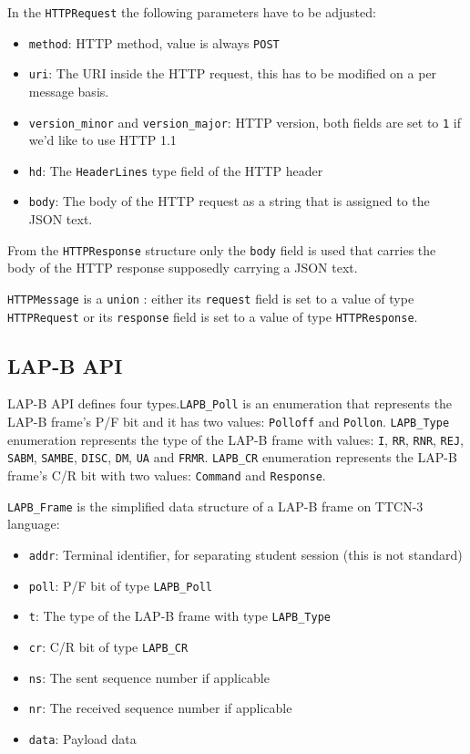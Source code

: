 \documentclass[a4paper]{article}
\begin{document}
In the \verb/HTTPRequest/ the following parameters have to be adjusted:
\begin{itemize}
\item \verb!method!: HTTP method, value is always \verb'POST'
\item \verb'uri': The URI inside the HTTP request, this has to be modified on a per message basis.
\item \verb!version_minor! and \verb!version_major!: HTTP version, both fields are set to \verb!1! if we'd like to use HTTP 1.1
\item \verb!hd!: The \verb/HeaderLines/ type field of the HTTP header
\item \verb!body!: The body of the HTTP request as a string that is assigned to the JSON text.
\end{itemize}

From the \verb!HTTPResponse! structure only the  \verb!body! field is used that carries the body of the HTTP response supposedly carrying a JSON text.

\verb!HTTPMessage! is a \verb!union! : either its \verb!request! field is set to a value of type \verb/HTTPRequest/ or its \verb!response! field is set to a value of type \verb!HTTPResponse!.

\subsection{LAP-B API}

LAP-B API defines four types.\verb/LAPB_Poll/ is an enumeration that represents the LAP-B frame's P/F bit and it has two values: \verb/Polloff/ and \verb/Pollon/. 
\verb/LAPB_Type/ enumeration represents the type of the LAP-B frame with values: \verb/I/, \verb/RR/, \verb/RNR/, \verb/REJ/,
\verb/SABM/, \verb/SAMBE/, \verb/DISC/, \verb/DM/, \verb/UA/ and
\verb/FRMR/. 
\verb/LAPB_CR/ enumeration represents the LAP-B frame's C/R bit with two values: \verb/Command/ and \verb/Response/.

\verb!LAPB_Frame! is the simplified data structure of a LAP-B frame on TTCN-3 language:
\begin{itemize}
\item \verb/addr/: Terminal identifier, for separating student session (this is not standard)
\item \verb!poll!:  P/F bit of type \verb/LAPB_Poll/ 
\item  \verb!t!: The type of the LAP-B frame with type \verb/LAPB_Type/
\item \verb!cr!: C/R bit of type \verb/LAPB_CR/ 
\item \verb!ns!: The sent sequence number if applicable
\item \verb!nr!: The received sequence number if applicable
\item \verb!data!: Payload data
\end{itemize}
\end{document}
